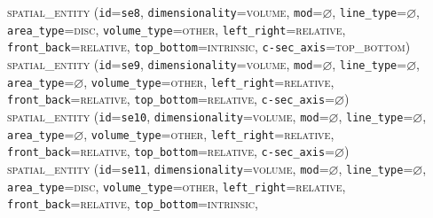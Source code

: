 \documentclass[11pt]{article}
\begin{document}
{        \textsc{spatial\_entity}
            (\texttt{id}=\texttt{se8},
            \texttt{dimensionality}=\textsc{volume},
            \texttt{mod}=$\varnothing$,
            \texttt{line\_type}=$\varnothing$,\\
            \texttt{area\_type}=\textsc{disc},
            \texttt{volume\_type}=\textsc{other},
            \texttt{left\_right}=\textsc{relative},\\
            \texttt{front\_back}=\textsc{relative},
            \texttt{top\_bottom}=\textsc{intrinsic},
            \texttt{c-sec\_axis}=\textsc{top\_bottom})\vspace{0.5em}\\
        \textsc{spatial\_entity}
            (\texttt{id}=\texttt{se9},
            \texttt{dimensionality}=\textsc{volume},
            \texttt{mod}=$\varnothing$,
            \texttt{line\_type}=$\varnothing$,\\
            \texttt{area\_type}=$\varnothing$,
            \texttt{volume\_type}=\textsc{other},
            \texttt{left\_right}=\textsc{relative},\\
            \texttt{front\_back}=\textsc{relative},
            \texttt{top\_bottom}=\textsc{relative},
            \texttt{c-sec\_axis}=$\varnothing$)\vspace{0.5em}\\
        \textsc{spatial\_entity}
            (\texttt{id}=\texttt{se10},
            \texttt{dimensionality}=\textsc{volume},
            \texttt{mod}=$\varnothing$,
            \texttt{line\_type}=$\varnothing$,\\
            \texttt{area\_type}=$\varnothing$,
            \texttt{volume\_type}=\textsc{other},
            \texttt{left\_right}=\textsc{relative},\\
            \texttt{front\_back}=\textsc{relative},
            \texttt{top\_bottom}=\textsc{relative},
            \texttt{c-sec\_axis}=$\varnothing$)\vspace{0.5em}\\
        \textsc{spatial\_entity}
            (\texttt{id}=\texttt{se11},
            \texttt{dimensionality}=\textsc{volume},
            \texttt{mod}=$\varnothing$,
            \texttt{line\_type}=$\varnothing$,\\
            \texttt{area\_type}=\textsc{disc},
            \texttt{volume\_type}=\textsc{other},
            \texttt{left\_right}=\textsc{relative},\\
            \texttt{front\_back}=\textsc{relative},
            \texttt{top\_bottom}=\textsc{intrinsic},
}
\end{document}
